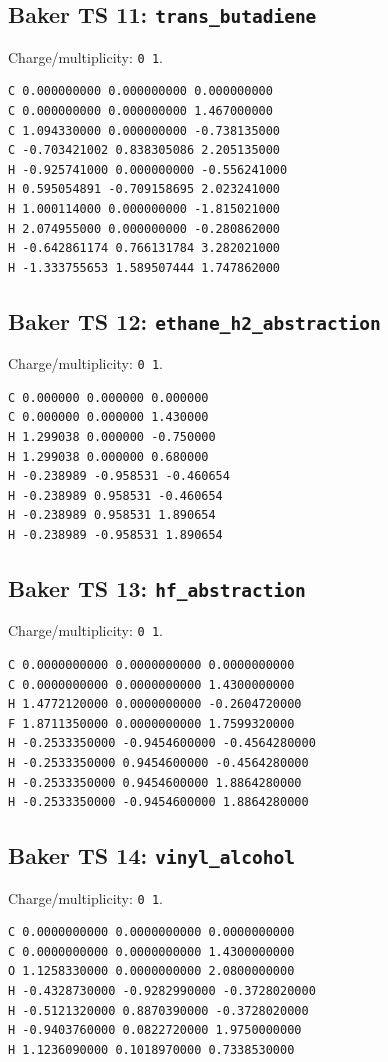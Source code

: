 \documentclass[10pt]{article}
\begin{document}
{\subsection*{Baker TS 11: \texttt{trans\_butadiene}}
Charge/multiplicity: \texttt{0 1}.
\begin{verbatim}
C 0.000000000 0.000000000 0.000000000
C 0.000000000 0.000000000 1.467000000
C 1.094330000 0.000000000 -0.738135000
C -0.703421002 0.838305086 2.205135000
H -0.925741000 0.000000000 -0.556241000
H 0.595054891 -0.709158695 2.023241000
H 1.000114000 0.000000000 -1.815021000
H 2.074955000 0.000000000 -0.280862000
H -0.642861174 0.766131784 3.282021000
H -1.333755653 1.589507444 1.747862000
\end{verbatim}
\subsection*{Baker TS 12: \texttt{ethane\_h2\_abstraction}}
Charge/multiplicity: \texttt{0 1}.
\begin{verbatim}
C 0.000000 0.000000 0.000000
C 0.000000 0.000000 1.430000
H 1.299038 0.000000 -0.750000
H 1.299038 0.000000 0.680000
H -0.238989 -0.958531 -0.460654
H -0.238989 0.958531 -0.460654
H -0.238989 0.958531 1.890654
H -0.238989 -0.958531 1.890654
\end{verbatim}
\subsection*{Baker TS 13: \texttt{hf\_abstraction}}
Charge/multiplicity: \texttt{0 1}.
\begin{verbatim}
C 0.0000000000 0.0000000000 0.0000000000
C 0.0000000000 0.0000000000 1.4300000000
H 1.4772120000 0.0000000000 -0.2604720000
F 1.8711350000 0.0000000000 1.7599320000
H -0.2533350000 -0.9454600000 -0.4564280000
H -0.2533350000 0.9454600000 -0.4564280000
H -0.2533350000 0.9454600000 1.8864280000
H -0.2533350000 -0.9454600000 1.8864280000
\end{verbatim}
\subsection*{Baker TS 14: \texttt{vinyl\_alcohol}}
Charge/multiplicity: \texttt{0 1}.
\begin{verbatim}
C 0.0000000000 0.0000000000 0.0000000000
C 0.0000000000 0.0000000000 1.4300000000
O 1.1258330000 0.0000000000 2.0800000000
H -0.4328730000 -0.9282990000 -0.3728020000
H -0.5121320000 0.8870390000 -0.3728020000
H -0.9403760000 0.0822720000 1.9750000000
H 1.1236090000 0.1018970000 0.7338530000
\end{verbatim}
}
\end{document}
